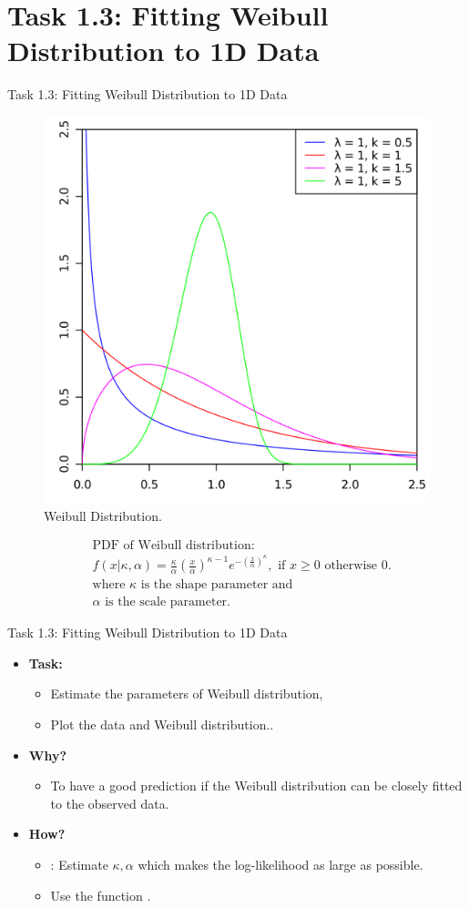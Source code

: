 \documentclass{beamer}
\begin{document}
\section{Task 1.3: Fitting Weibull Distribution to 1D Data}
\begin{frame}{Task 1.3: Fitting Weibull Distribution to 1D Data}

\begin{figure}
	\centering
	\includegraphics[width=.3\textwidth]{images/weibull.png}
	\caption{Weibull Distribution.}
\end{figure}
\vspace{-0.3cm}
\begin{align*}
&\text{PDF of Weibull distribution: }\\
&f(x|\kappa, \alpha)=\frac{\kappa}{\alpha}\left(\frac{x}{\alpha} \right)^{\kappa-1}e^{-\left( \frac{x}{\alpha}\right)^\kappa}, \text{ if } x\geq 0 \text{ otherwise } 0.  \\
&\text{where } \kappa \text{ is the shape parameter and} \\ 
&\alpha \text{ is the scale parameter.}
\end{align*}
\end{frame}

\begin{frame}{Task 1.3: Fitting Weibull Distribution to 1D Data}
\begin{itemize}
	\item \textbf{Task:} 
	\begin{itemize}
		\item Estimate the parameters of Weibull distribution,
		\item Plot the data and Weibull distribution..
	\end{itemize}
	\item \textbf{Why?}
	\begin{itemize}
		\item To have a good prediction if the Weibull distribution can be closely fitted to the observed data.
	\end{itemize}
	\item \textbf{How?} 
	\begin{itemize}
		\item {}: Estimate $\kappa, \alpha$ which makes the log-likelihood as large as possible.
		\item Use the function .
	\end{itemize}

\end{itemize}
\end{frame}
\end{document}
